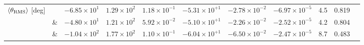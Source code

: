 \begin{sidewaystable}
{\begin{tabular}{l|l|ccccccccc}
        \hline
        $\langle\theta_{\rm RMS}\rangle$ [deg] & \DSrefset{} & $-6.85\times10^{1}$ & $1.29\times10^{2}$ & $1.18\times10^{-1}$ & $-5.31\times10^{+1}$ & $-2.78\times10^{-2}$ & $-6.97\times10^{-5}$ & 4.5 & 0.819 \\ 
\rowcolor{lightgray} & \& \DSheatcool{} & $-4.80\times10^{1}$ & $1.21\times10^{2}$ & $5.92\times10^{-2}$ & $-5.10\times10^{+1}$ & $-2.26\times10^{-2}$ & $-2.52\times10^{-5}$ & 4.2 & 0.804 \\ 
        & \& \DScool{} & $-1.04\times10^{2}$ & $1.77\times10^{2}$ & $1.10\times10^{-1}$ & $-6.04\times10^{+1}$ & $-6.50\times10^{-2}$ & $-2.47\times10^{-5}$ & 8.7 & 0.483 \\
        \hline\hline
    \end{tabular}
}
\end{sidewaystable}

